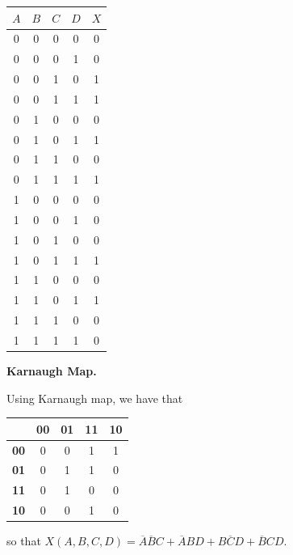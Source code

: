 \documentclass[9pt]{article}
\begin{document}
\begin{enumerate}
   \begin{center}
    \begin{tabular}{@{}|c|c|c|c|c|@{}}
   \hline
         $A$ & $B$ & $C$ & $D$ & $X$ \\ \hline
         0 & 0 & 0 & 0 & 0 \\ \hline
         0 & 0 & 0 & 1 & 0 \\ \hline
         0 & 0 & 1 & 0 & 1 \\ \hline
         0 & 0 & 1 & 1 & 1 \\ \hline
         0 & 1 & 0 & 0 & 0 \\ \hline
         0 & 1 & 0 & 1 & 1 \\ \hline
         0 & 1 & 1 & 0 & 0 \\ \hline
         0 & 1 & 1 & 1 & 1 \\ \hline
         1 & 0 & 0 & 0 & 0 \\ \hline
         1 & 0 & 0 & 1 & 0 \\ \hline
         1 & 0 & 1 & 0 & 0 \\ \hline
         1 & 0 & 1 & 1 & 1 \\ \hline
         1 & 1 & 0 & 0 & 0 \\ \hline
         1 & 1 & 0 & 1 & 1 \\ \hline
         1 & 1 & 1 & 0 & 0 \\ \hline
         1 & 1 & 1 & 1 & 0 \\ \hline
\end{tabular}
   \end{center}
   
   \textbf{Karnaugh Map.}   
   
   Using Karnaugh map, we have that
            \begin{center}
            \begin{tabular}{@{}|c|c|c|c|c|@{}}
            \hline
            & \textbf{00} & \textbf{01} & \textbf{11} & \textbf{10} \\ \hline
            \textbf{00} & 0 & 0 & 1 & 1 \\ \hline
            \textbf{01} & 0 & 1 & 1 & 0 \\ \hline
            \textbf{11} & 0 & 1 & 0 & 0 \\ \hline
            \textbf{10} & 0 & 0 & 1 & 0 \\
            \hline
\end{tabular}
            \end{center}
            so that $X(A, B, C, D) = \overline{A}\overline{B}C + \overline{A}BD
            + B\overline{C}D + \overline{B}CD$.
\end{enumerate}
\end{document}
